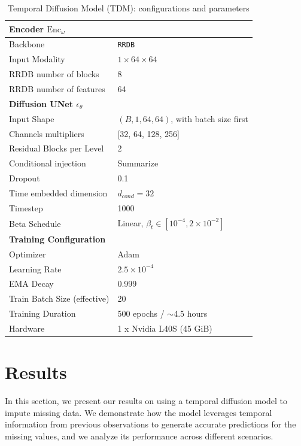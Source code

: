 \begin{table}[h]
\captionsetup{justification=raggedright,singlelinecheck=false}
\caption{Temporal Diffusion Model (TDM): configurations and parameters}
\begin{tabular}{ll}
\toprule
\multicolumn{2}{l}{\textbf{Encoder $\mathrm{Enc}_{\omega}$}} \\
\midrule
Backbone & \texttt{RRDB} \cite{zhang2018RRDB} \\
Input Modality & $1 \times 64 \times 64 $ \\
RRDB number of blocks & 8 \\
RRDB number of features & 64 \\
\midrule
\multicolumn{2}{l}{\textbf{Diffusion UNet $\epsilon_{\theta}$}} \\
\midrule
Input Shape & $(B, 1, 64, 64)$, with batch size first \\
Channels multipliers & [32, 64, 128, 256] \\
Residual Blocks per Level & 2 \\
Conditional injection & Summarize \\
Dropout & 0.1 \\
Time embedded dimension & $d_{cond} = 32$ \\
Timestep & 1000 \\
Beta Schedule & Linear, $\beta_t \in [10^{-4}, 2 \times 10^{-2}]$ \\
\midrule
\multicolumn{2}{l}{\textbf{Training Configuration}} \\
\midrule
Optimizer & Adam \\
Learning Rate & $2.5 \times 10^{-4}$ \\
EMA Decay & 0.999 \\
Train Batch Size (effective) & 20 \\
Training Duration & 500 epochs / $\sim$4.5 hours \\
Hardware & 1 x Nvidia L40S (45 GiB) \\
\bottomrule
\end{tabular}
\label{tab:tdm-config}
\end{table}

\section{Results}
\label{sec:result-tdm}

In this section, we present our results on using a temporal diffusion model to impute missing data. We demonstrate how the model leverages temporal information from previous observations to generate accurate predictions for the missing values, and we analyze its performance across different scenarios.

